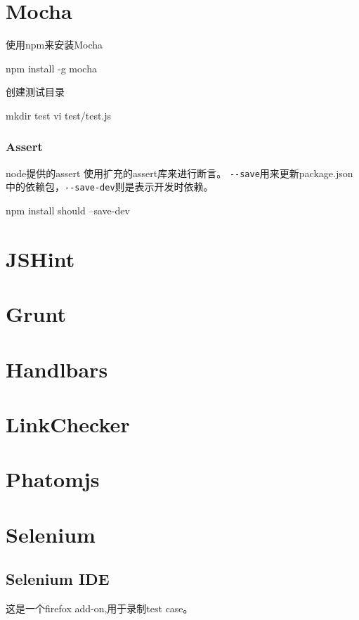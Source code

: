 \chapter{Mocha}

使用npm来安装Mocha
\begin{Bash}
npm install -g mocha
\end{Bash}
创建测试目录
\begin{Bash}
mkdir test
vi test/test.js
\end{Bash}

\subsection{Assert}
node提供的assert
使用扩充的assert库来进行断言。 \lstinline!--save!用来更新package.json中的依赖包，\lstinline!--save-dev!则是表示开发时依赖。
\begin{Bash}
npm install should --save-dev
\end{Bash}



\chapter{JSHint}

\chapter{Grunt}

\chapter{Handlbars}

\chapter{LinkChecker}

\chapter{Phatomjs}

\chapter{Selenium}

\section{Selenium IDE}
这是一个firefox add-on,用于录制test case。

